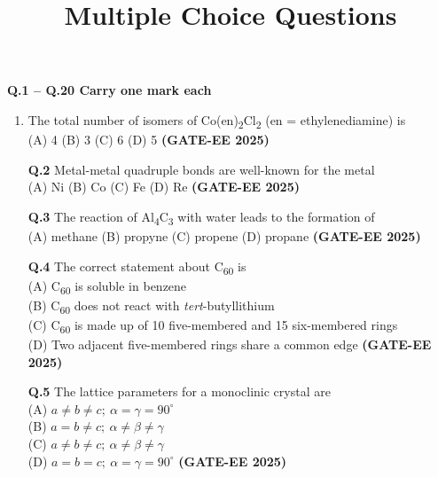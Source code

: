 \documentclass[12pt]{article}
\title{Multiple Choice Questions}
\date{}
\begin{document}
\maketitle

\textbf{Q.1 -- Q.20 Carry one mark each}

\begin{enumerate}

   \item   The total number of isomers of Co(en)\textsubscript{2}Cl\textsubscript{2} (en = ethylenediamine) is\\
    (A) 4 \quad (B) 3 \quad (C) 6 \quad (D) 5                         
      \textbf{(GATE-EE 2025)}

    \vspace{0.5cm}

   \textbf{Q.2}  Metal-metal quadruple bonds are well-known for the metal\\
    (A) Ni \quad (B) Co \quad (C) Fe \quad (D) Re   
  \textbf{(GATE-EE 2025)}
    
    \vspace{0.5cm}

    \textbf{Q.3} The reaction of Al\textsubscript{4}C\textsubscript{3} with water leads to the formation of\\
    (A) methane \quad (B) propyne \quad (C) propene \quad (D) propane  
  \textbf{(GATE-EE 2025)}

    \vspace{0.5cm}

   \textbf{Q.4}  The correct statement about C\textsubscript{60} is\\
    (A) C\textsubscript{60} is soluble in benzene\\
    (B) C\textsubscript{60} does not react with \textit{tert}-butyllithium\\
    (C) C\textsubscript{60} is made up of 10 five-membered and 15 six-membered rings\\
    (D) Two adjacent five-membered rings share a common edge   \textbf{(GATE-EE 2025)}

    \vspace{0.5cm}

   \textbf{Q.5} The lattice parameters for a monoclinic crystal are\\
    (A) $a \neq b \neq c; \ \alpha = \gamma = 90^\circ$\\
    (B) $a = b \neq c; \ \alpha \neq \beta \neq \gamma$\\
    (C) $a \neq b \neq c; \ \alpha \neq \beta \neq \gamma$\\
    (D) $a = b = c; \ \alpha = \gamma = 90^\circ$   \textbf{(GATE-EE 2025)}



\end{enumerate}
\end{document}
